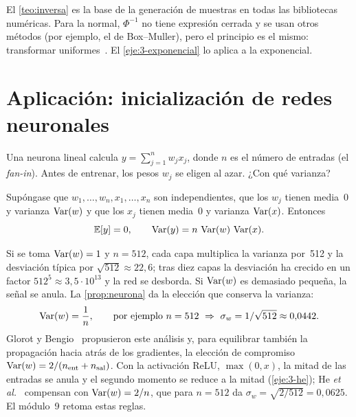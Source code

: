 \begin{observacion}
El \cref{teo:inversa} es la base de la generación de muestras en todas las bibliotecas numéricas. Para la normal, $\Phi^{-1}$ no tiene expresión cerrada y se usan otros métodos (por ejemplo, el de Box--Muller), pero el principio es el mismo: transformar uniformes~\cite[§6.7]{mml}. El \cref{eje:3-exponencial} lo aplica a la exponencial.
\end{observacion}

\section{Aplicación: inicialización de redes neuronales}

Una neurona lineal calcula $y=\sum_{j=1}^{n}w_jx_j$, donde $n$ es el número de entradas (el \emph{fan-in}). Antes de entrenar, los pesos $w_j$ se eligen al azar. ¿Con qué varianza?

\begin{proposicion}\label{prop:neurona}
Supóngase que $w_1,\dots,w_n,x_1,\dots,x_n$ son independientes, que los $w_j$ tienen media~0 y varianza $\operatorname{Var}(w)$ y que los $x_j$ tienen media~0 y varianza $\operatorname{Var}(x)$. Entonces
\[
\mathbb{E}[y]=0,\qquad \operatorname{Var}(y)=n\,\operatorname{Var}(w)\,\operatorname{Var}(x).
\]
\end{proposicion}

Si se toma $\operatorname{Var}(w)=1$ y $n=512$, cada capa multiplica la varianza por~512 y la desviación típica por $\sqrt{512}\approx 22{,}6$; tras diez capas la desviación ha crecido en un factor $512^{5}\approx 3{,}5\cdot 10^{13}$ y la red se desborda. Si $\operatorname{Var}(w)$ es demasiado pequeña, la señal se anula. La \cref{prop:neurona} da la elección que conserva la varianza:
\[
\Var(w)=\frac1n,\qquad\text{por ejemplo } n=512\ \Rightarrow\ \sigma_w=1/\sqrt{512}\approx 0{,}0442.
\]
Glorot y Bengio~\cite{glorot} propusieron este análisis y, para equilibrar también la propagación hacia atrás de los gradientes, la elección de compromiso $\operatorname{Var}(w)=2/(n_{\mathrm{ent}}+n_{\mathrm{sal}})$. Con la activación ReLU, $\max(0,x)$, la mitad de las entradas se anula y el segundo momento se reduce a la mitad (\cref{eje:3-he}); He \emph{et al.}~\cite{he} compensan con $\operatorname{Var}(w)=2/n$, que para $n=512$ da $\sigma_w=\sqrt{2/512}=0{,}0625$. El módulo~9 retoma estas reglas.

